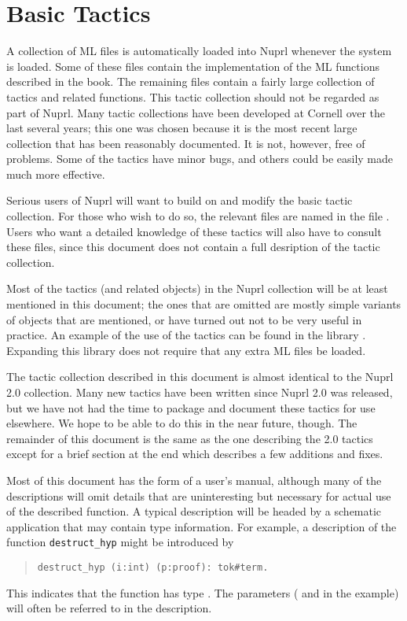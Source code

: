 

\chapter{Basic Tactics}

\label{basic}


A collection of ML files is automatically loaded into Nuprl whenever the
system is loaded.  Some of these files contain the implementation of the ML
functions described in the book.  The remaining files contain a fairly
large collection of tactics and related functions.  This tactic collection
should not be regarded as part of Nuprl.  Many tactic collections have been
developed at Cornell over the last several years; this one was chosen
because it is the most recent large collection that has been reasonably
documented.  It is not, however, free of problems.  Some of the tactics
have minor bugs, and others could be easily made much more effective.

Serious users of Nuprl will want to build on and modify the basic tactic
collection.  For those who wish to do so, the relevant files are named in the
file .  Users who want a detailed knowledge of these tactics
will also have to consult these files, since this document does not contain a
full desription of the tactic collection.

Most of the tactics (and related objects) in the Nuprl collection will be
at least mentioned in this document; the ones that are omitted are mostly
simple variants of objects that are mentioned, or have turned out not to be
very useful in practice.  An example of the use of the tactics can be found
in the library .  Expanding this library
does not require that any extra ML files be loaded.

The tactic collection described in this document is almost identical to the
Nuprl 2.0 collection.  Many new tactics have been written since Nuprl 2.0
was released, but we have not had the time to package and document these
tactics for use elsewhere.  We hope to be able to do this in the near
future, though.  The remainder of this document is the same as the one
describing the 2.0 tactics except for a brief section at the end which
describes a few additions and fixes.

Most of this document has the form of a user's manual, although many of the
descriptions will omit details that are uninteresting but necessary for
actual use of the described function.  A typical description will be headed
by a schematic application that may contain type information.  For example, a
description of the function {\tt destruct\_hyp} might be introduced by
\begin{quote}
\tt       destruct\_hyp (i:int) (p:proof): tok\#term.  
\end{quote}
This indicates that the function has type .  The
parameters ( and  in the example) will often be referred to
in the description.

